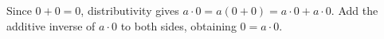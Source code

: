 Since $0+0=0$, distributivity gives $a\cdot0=a(0+0)=a\cdot0+a\cdot0$. Add the additive inverse of $a\cdot0$ to both sides, obtaining $0=a\cdot0$.
